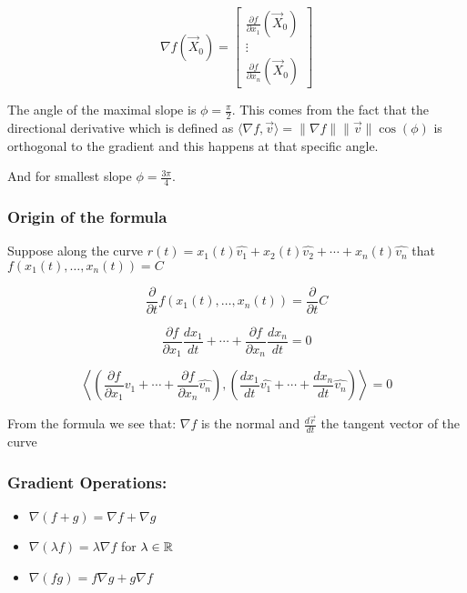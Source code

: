 \[
    \nabla f(\vec{X}_0) = \begin{bmatrix}
    \frac{\partial f}{\partial x_1}(\vec{X}_0) \\
    \vdots \\
    \frac{\partial f}{\partial x_n}(\vec{X}_0)
    \end{bmatrix}
\]

The angle of the maximal slope is \(\phi = \frac{\pi}{2}\). This comes from the fact that 
the directional derivative which is defined as \(\langle \nabla f, \vec{v}\rangle = \|\nabla f\| 
\|\vec{v}\| \cos(\phi)\) is orthogonal to the gradient and this happens at that specific angle. 

And for smallest slope \(\phi = \frac{3 \pi}{4}\).

\subsubsection{Origin of the formula}

Suppose along the curve \(r(t) = x_1(t)\hat{v_1} + x_2(t)\hat{v_2} + \cdots + x_n(t)\hat{v_n}\) that 
\(f(x_1(t), \dots, x_n(t)) = C\)

\[
    \frac{\partial}{\partial t}f(x_1(t), \dots, x_n(t)) = \frac{\partial}{\partial t}C
\]

\[
    \frac{\partial f}{\partial x_1}\frac{dx_1}{dt} + \cdots + \frac{\partial f}{\partial x_n}
    \frac{dx_n}{dt} = 0
\]

\[
    \left\langle \left(\frac{\partial f}{\partial x_1}\hat{v_1} + \cdots + \frac{\partial f}{\partial x_n}
    \hat{v_n}\right) , \left( \frac{dx_1}{dt}\hat{v_1} + \cdots + \frac{dx_n}{dt}\hat{v_n}\right)\right\rangle = 0
\]

From the formula we see that: \(\nabla f\) is the normal and \(\frac{d\vec{r}}{dt}\) the tangent vector 
of the curve

\QED

\subsubsection{Gradient Operations:}

\begin{itemize}

    \item \( \nabla(f + g) = \nabla f + \nabla g \)

    \item \( \nabla(\lambda f) = \lambda \nabla f \) for \( \lambda \in \mathbb{R} \)

    \item \( \nabla(fg) = f \nabla g + g \nabla f \)

\end{itemize}

